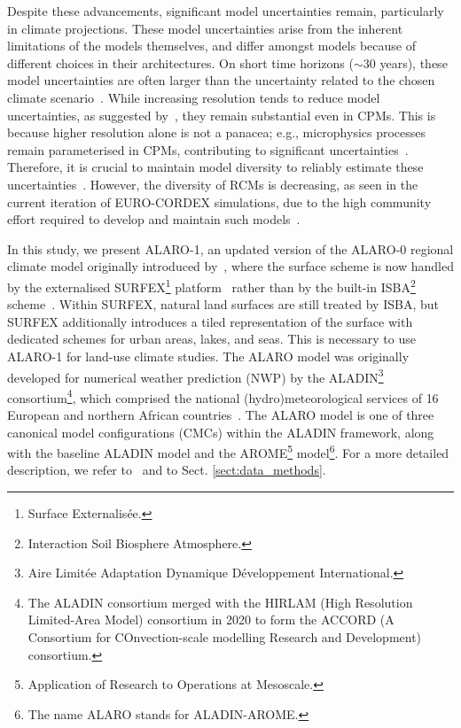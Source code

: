 \documentclass[journal abbreviation, manuscript]{copernicus}
\begin{document}
Despite these advancements, significant model uncertainties remain, particularly in climate projections. 
These model uncertainties arise from the inherent limitations of the models themselves, and differ amongst models because of different choices in their architectures.
On short time horizons ($\sim$30 years), these model uncertainties are often larger than the uncertainty related to the chosen climate scenario~\citep{lehner_partitioning_2020}.
While increasing resolution tends to reduce model uncertainties, as suggested by~\citet{fosser_convection-permitting_2024}, they remain substantial even in CPMs. 
This is because higher resolution alone is not a panacea; e.g., microphysics processes remain parameterised in CPMs, contributing to significant uncertainties~\citep{prein_review_2015, lucas-picher_convection-permitting_2021}. 
Therefore, it is crucial to maintain model diversity to reliably estimate these uncertainties~\citep{IPCC_AR6_ch10}.
However, the diversity of RCMs is decreasing, as seen in the current iteration of EURO-CORDEX simulations, due to the high community effort required to develop and maintain such models~\citep{jacob_regional_2020, cordex_cmip6_downscaling_plans}.

In this study, we present ALARO-1, an updated version of the ALARO-0 regional climate model originally introduced by~\citet{de_troch_multiscale_2013}, where the surface scheme is now handled by the externalised SURFEX\footnote{Surface Externalisée.} platform~\citep{masson_surfexv72_2013, hamdi_evaluating_2014} rather than by the built-in ISBA\footnote{Interaction Soil Biosphere Atmosphere.} scheme~\citep{noilhan_simple_1989, noilhan_isba_1996}.
Within SURFEX, natural land surfaces are still treated by ISBA, but SURFEX additionally introduces a tiled representation of the surface with dedicated schemes for urban areas, lakes, and seas.
This is necessary to use ALARO-1 for land-use climate studies.
The ALARO model was originally developed for numerical weather prediction (NWP) by the ALADIN\footnote{Aire Limitée Adaptation Dynamique Développement International.} consortium\footnote{The ALADIN consortium merged with the HIRLAM (High Resolution Limited-Area Model) consortium in 2020 to form the ACCORD (A Consortium for COnvection-scale modelling Research and Development) consortium.}, which comprised the national (hydro)meteorological services of 16 European and northern African countries~\citep{termonia_aladin_2018}.
The ALARO model is one of three canonical model configurations (CMCs) within the ALADIN framework, along with the baseline ALADIN model and the AROME\footnote{Application of Research to Operations at Mesoscale.} model\footnote{The name ALARO stands for ALADIN-AROME.}.
For a more detailed description, we refer to~\citet{termonia_aladin_2018} and to Sect. \ref{sect:data_methods}.
\end{document}
